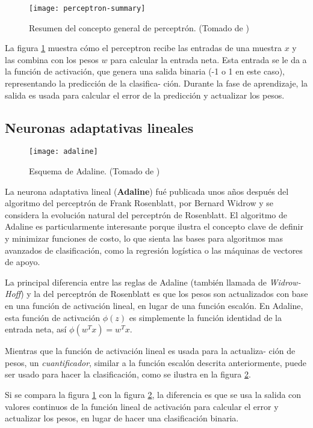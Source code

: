 \begin{figure}[H]
  \texttt{[image: perceptron-summary]}
  \centering
  \caption{Resumen del concepto general de perceptrón. (Tomado de \cite{python})}
  \label{fig:perceptron}
\end{figure}

La figura \ref{fig:perceptron} muestra cómo el perceptron recibe las entradas de una
muestra $x$ y las combina con los pesos $w$ para calcular la entrada neta.
Esta entrada se le da a la función de activación, que genera una salida
binaria (-1 o 1 en este caso), representando la predicción de la clasifica-
ción. Durante la fase de aprendizaje, la salida es usada para calcular el
error de la predicción y actualizar los pesos.

\subsection{Neuronas adaptativas lineales}

\begin{figure}[H]
  \texttt{[image: adaline]}
  \centering
  \caption{Esquema de Adaline. (Tomado de \cite{python})}
  \label{fig:adaline}
\end{figure}

La neurona adaptativa lineal (\textbf{Adaline}) fué publicada unos años
después del algoritmo del perceptrón de Frank Rosenblatt, por Bernard
Widrow \cite{adaline} y se considera la evolución natural del perceptrón
de Rosenblatt.
El algoritmo de Adaline es particularmente interesante porque ilustra
el concepto clave de definir y minimizar funciones de costo, lo que
sienta las bases para algoritmos mas avanzados de clasificación,
como la regresión logística o las máquinas de vectores de apoyo.

La principal diferencia entre las reglas de Adaline (también llamada
de \textit{Widrow-Hoff}) y la del perceptrón de Rosenblatt es que los
pesos son actualizados con base en una función de activación lineal,
en lugar de una función escalón. En Adaline, esta función de activación
$\phi (z)$ es simplemente la función identidad de la entrada neta, así
$\phi (w^T x) = w^T x$.

Mientras que la función de activación lineal es usada para la actualiza-
ción de pesos, un \textit{cuantificador}, similar a la función escalón
descrita anteriormente, puede ser usado para hacer la clasificación,
como se ilustra en la figura \ref{fig:adaline}.

Si se compara la figura \ref{fig:perceptron} con la figura \ref{fig:adaline},
la diferencia es que se usa la salida con valores continuos
de la función lineal de activación para calcular el error y actualizar
los pesos, en lugar de hacer una clasificación binaria.

